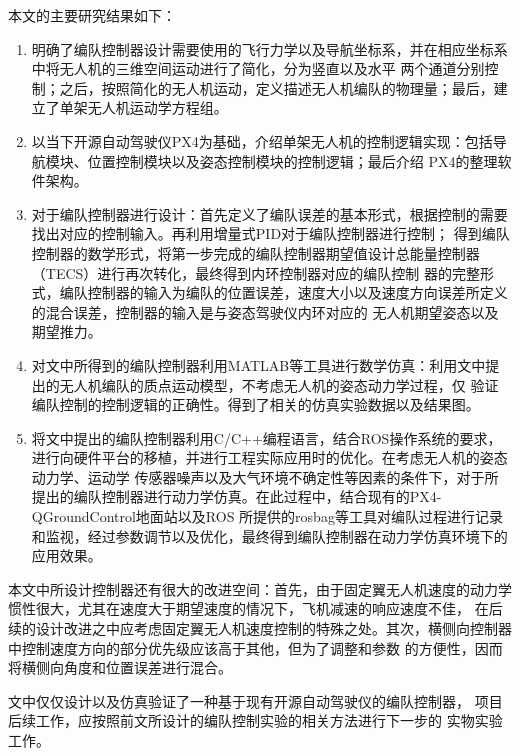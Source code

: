 本文的主要研究结果如下：
\begin{enumerate}
    \item 明确了编队控制器设计需要使用的飞行力学以及导航坐标系，并在相应坐标系中将无人机的三维空间运动进行了简化，分为竖直以及水平
        两个通道分别控制；之后，按照简化的无人机运动，定义描述无人机编队的物理量；最后，建立了单架无人机运动学方程组。
    \item 以当下开源自动驾驶仪PX4为基础，介绍单架无人机的控制逻辑实现：包括导航模块、位置控制模块以及姿态控制模块的控制逻辑；最后介绍
        PX4的整理软件架构。
    \item 对于编队控制器进行设计：首先定义了编队误差的基本形式，根据控制的需要找出对应的控制输入。再利用增量式PID对于编队控制器进行控制；
        得到编队控制器的数学形式，将第一步完成的编队控制器期望值设计总能量控制器（TECS）进行再次转化，最终得到内环控制器对应的编队控制
        器的完整形式，编队控制器的输入为编队的位置误差，速度大小以及速度方向误差所定义的混合误差，控制器的输入是与姿态驾驶仪内环对应的
        无人机期望姿态以及期望推力。
    \item 对文中所得到的编队控制器利用MATLAB等工具进行数学仿真：利用文中提出的无人机编队的质点运动模型，不考虑无人机的姿态动力学过程，仅
        验证编队控制的控制逻辑的正确性。得到了相关的仿真实验数据以及结果图。
    \item 将文中提出的编队控制器利用C/C++编程语言，结合ROS操作系统的要求，进行向硬件平台的移植，并进行工程实际应用时的优化。在考虑无人机的姿态动力学、运动学
        传感器噪声以及大气环境不确定性等因素的条件下，对于所提出的编队控制器进行动力学仿真。在此过程中，结合现有的PX4-QGroundControl地面站以及ROS
        所提供的rosbag等工具对编队过程进行记录和监视，经过参数调节以及优化，最终得到编队控制器在动力学仿真环境下的应用效果。
\end{enumerate}
本文中所设计控制器还有很大的改进空间：首先，由于固定翼无人机速度的动力学惯性很大，尤其在速度大于期望速度的情况下，飞机减速的响应速度不佳，
在后续的设计改进之中应考虑固定翼无人机速度控制的特殊之处。其次，横侧向控制器中控制速度方向的部分优先级应该高于其他，但为了调整和参数
的方便性，因而将横侧向角度和位置误差进行混合。

文中仅仅设计以及仿真验证了一种基于现有开源自动驾驶仪的编队控制器，
项目后续工作，应按照前文所设计的编队控制实验的相关方法进行下一步的
实物实验工作。
